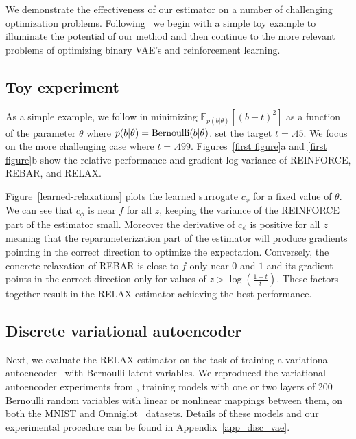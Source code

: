 \documentclass{article}
\newcommand{\RELAX}{{\textnormal{RELAX}}}
\begin{document}
%
We demonstrate the effectiveness of our estimator on a number of challenging optimization problems. Following~\citet{tucker2017rebar} we begin with a simple toy example to illuminate the potential of our method and then continue to the more relevant problems of optimizing binary VAE's and reinforcement learning.

\subsection{Toy experiment}
As a simple example, we follow \citet{tucker2017rebar} in minimizing $\mathbb{E}_{p(b|\theta)}[(b - t)^2]$ as a function of the parameter $\theta$ where {$p(b|\theta) = \textnormal{Bernoulli}(b|\theta)$}.
\citet{tucker2017rebar} set the target $t = .45$.
We focus on the more challenging case where $t = .499$.
Figures~\ref{first figure}a and \ref{first figure}b show the relative performance and gradient log-variance of REINFORCE, REBAR, and RELAX.


Figure~\ref{learned-relaxations} plots the learned surrogate $c_\phi$ for a fixed value of $\theta$. We can see that $c_\phi$ is near $f$ for all $z$, keeping the variance of the REINFORCE part of the estimator small. Moreover the derivative of $c_\phi$ is positive for all $z$ meaning that the reparameterization part of the estimator will produce gradients pointing in the correct direction to optimize the expectation. Conversely, the concrete relaxation of REBAR is close to $f$ only near $0$ and $1$ and its gradient points in the correct direction only for values of $z > \log (\frac{1-t}{t})$. These factors together result in the RELAX estimator achieving the best performance. 

\subsection{Discrete variational autoencoder}
\label{vae section}
Next, we evaluate the \RELAX{} estimator on the task of training a variational autoencoder~\citep{kingma2013autoencoding, rezende2014stochastic} with Bernoulli latent variables.
We reproduced the variational autoencoder experiments from \citet{tucker2017rebar}, training models with one or two layers of 200 Bernoulli random variables with linear or nonlinear mappings between them, on both  the MNIST and Omniglot~\citep{lake2015human} datasets.
Details of these models and our experimental procedure can be found in Appendix~\ref{app_disc_vae}.
\end{document}

